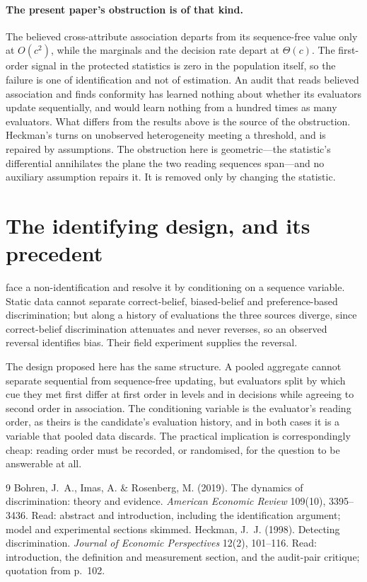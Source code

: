 \documentclass[11pt,a4paper]{article}
\newcommand{\bigO}{O}
\begin{document}
\paragraph{The present paper's obstruction is of that kind.}
The believed cross-attribute association departs from its sequence-free value
only at $\bigO(c^{2})$, while the marginals and the decision rate depart at
$\Theta(c)$. The first-order signal in the protected statistics is zero in the
population itself, so the failure is one of identification and not of estimation.
An audit that reads believed association and finds conformity has learned
nothing about whether its evaluators update sequentially, and would learn nothing
from a hundred times as many evaluators. What differs from the results above is
the source of the obstruction. Heckman's turns on unobserved heterogeneity
meeting a threshold, and is repaired by assumptions. The obstruction here is
geometric---the statistic's differential annihilates the plane the two reading
sequences span---and no auxiliary assumption repairs it. It is removed only by
changing the statistic.

\section*{The identifying design, and its precedent}

\citet{Bohren2019} face a non-identification and resolve it by conditioning on a
sequence variable. Static data cannot separate correct-belief, biased-belief and
preference-based discrimination; but along a history of evaluations the three
sources diverge, since correct-belief discrimination attenuates and never
reverses, so an observed reversal identifies bias. Their field experiment
supplies the reversal.

The design proposed here has the same structure. A pooled aggregate cannot
separate sequential from sequence-free updating, but evaluators split by which
cue they met first differ at first order in levels and in decisions while
agreeing to second order in association. The conditioning variable is the
evaluator's reading order, as theirs is the candidate's evaluation history, and
in both cases it is a variable that pooled data discards. The practical
implication is correspondingly cheap: reading order must be recorded, or
randomised, for the question to be answerable at all.

\bigskip

\begin{thebibliography}{9}
Bohren, J.~A., Imas, A. \&
  Rosenberg, M. (2019). The dynamics of discrimination: theory and evidence.
  \emph{American Economic Review} 109(10), 3395--3436. Read: abstract and
  introduction, including the identification argument; model and experimental
  sections skimmed.
Heckman, J.~J. (1998). Detecting
  discrimination. \emph{Journal of Economic Perspectives} 12(2), 101--116. Read:
  introduction, the definition and measurement section, and the audit-pair
  critique; quotation from p.~102.
\end{thebibliography}
\end{document}
